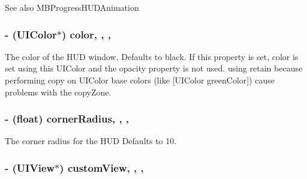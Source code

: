 \begin{DoxySeeAlso}{See also}
M\+B\+Progress\+H\+U\+D\+Animation 
\end{DoxySeeAlso}
\hypertarget{interface_m_b_progress_h_u_d_a1f4ab0f3ddc52af9353a4cf225ad1361}{
\subsubsection[{color}]{\setlength{\rightskip}{0pt plus 5cm}-\/ (U\+I\+Color$\ast$) color\hspace{0.3cm}{\ttfamily [read]}, {\ttfamily [write]}, {\ttfamily [atomic]}, {\ttfamily [assign]}}}\label{interface_m_b_progress_h_u_d_a1f4ab0f3ddc52af9353a4cf225ad1361}
The color of the H\+U\+D window. Defaults to black. If this property is set, color is set using this U\+I\+Color and the opacity property is not used. using retain because performing copy on U\+I\+Color base colors (like \mbox{[}U\+I\+Color green\+Color\mbox{]}) cause problems with the copy\+Zone. \hypertarget{interface_m_b_progress_h_u_d_a8a3573dbf4dcdeeb187a08d0070e811c}{
\subsubsection[{corner\+Radius}]{\setlength{\rightskip}{0pt plus 5cm}-\/ (float) corner\+Radius\hspace{0.3cm}{\ttfamily [read]}, {\ttfamily [write]}, {\ttfamily [atomic]}, {\ttfamily [assign]}}}\label{interface_m_b_progress_h_u_d_a8a3573dbf4dcdeeb187a08d0070e811c}
The corner radius for the H\+U\+D Defaults to 10. \hypertarget{interface_m_b_progress_h_u_d_a78f89e05d797a46bf9b41a5dfd1f5d4a}{
\subsubsection[{custom\+View}]{\setlength{\rightskip}{0pt plus 5cm}-\/ (U\+I\+View$\ast$) custom\+View\hspace{0.3cm}{\ttfamily [read]}, {\ttfamily [write]}, {\ttfamily [atomic]}, {\ttfamily [assign]}}}\label{interface_m_b_progress_h_u_d_a78f89e05d797a46bf9b41a5dfd1f5d4a}
